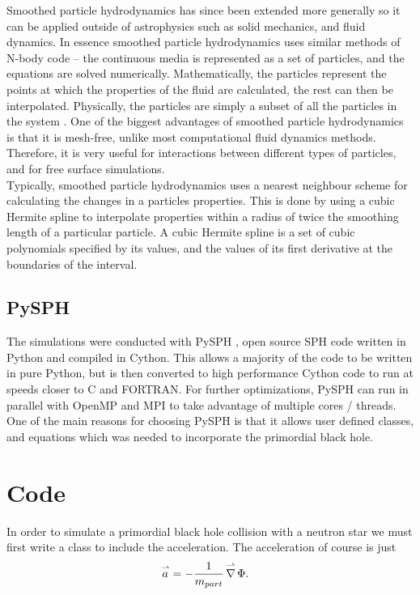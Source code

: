 Smoothed particle hydrodynamics has since been extended more generally so it can be applied outside of astrophysics such as solid mechanics, and fluid dynamics. In essence smoothed particle hydrodynamics uses similar methods of N-body code -- the continuous media is represented as a set of particles, and the equations are solved numerically. Mathematically, the particles represent the points at which the properties of the fluid are calculated, the rest can then be interpolated. Physically, the particles are simply a subset of all the particles in the system \cite{newsph}. One of the biggest advantages of smoothed particle hydrodynamics is that it is mesh-free, unlike most computational fluid dynamics methods. Therefore, it is very useful for interactions between different types of particles, and for free surface simulations. \\

Typically, smoothed particle hydrodynamics uses a nearest neighbour scheme for calculating the changes in a particles properties. This is done by using a cubic Hermite spline to interpolate properties within a radius of twice the smoothing length of a particular particle. A cubic Hermite spline is a set of cubic polynomials specified by its values, and the values of its first derivative at the boundaries of the interval.

\subsection{PySPH}
The simulations were conducted with PySPH \cite{pysph}, open source SPH code written in Python and compiled in Cython. This allows a majority of the code to be written in pure Python, but is then converted to high performance Cython code to run at speeds closer to C and FORTRAN. For further optimizations, PySPH can run in parallel with OpenMP and MPI to take advantage of multiple cores / threads. One of the main reasons for choosing PySPH is that it allows user defined classes, and equations which was needed to incorporate the primordial black hole.

\section{Code}

In order to simulate a primordial black hole collision with a neutron star we must first write a class to include the acceleration. The acceleration of course is just
\begin{align*}
\overset{\rightharpoonup}a &= - \frac{1}{m_{part}} \operatorname{\overset{\rightharpoonup}\nabla} \Phi.
\end{align*}

